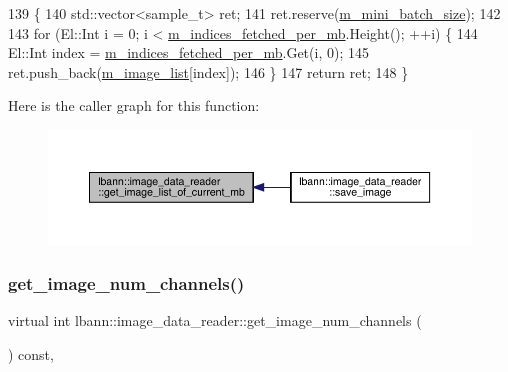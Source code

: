 \begin{DoxyCode}
139                                                                                            \{
140   std::vector<sample\_t> ret;
141   ret.reserve(\hyperlink{classlbann_1_1generic__data__reader_a96f87a7d09711ab3eee3940ff2aa36ec}{m\_mini\_batch\_size});
142 
143   \textcolor{keywordflow}{for} (El::Int i = 0; i < \hyperlink{classlbann_1_1generic__data__reader_a4ee1a159c74561c15a5e0c267ad3cc6a}{m\_indices\_fetched\_per\_mb}.Height(); ++i) \{
144     El::Int index = \hyperlink{classlbann_1_1generic__data__reader_a4ee1a159c74561c15a5e0c267ad3cc6a}{m\_indices\_fetched\_per\_mb}.Get(i, 0);
145     ret.push\_back(\hyperlink{classlbann_1_1image__data__reader_ae3fc949bd08c45ceafb1a03503261008}{m\_image\_list}[index]);
146   \}
147   \textcolor{keywordflow}{return} ret;
148 \}
\end{DoxyCode}
Here is the caller graph for this function\+:\nopagebreak
\begin{figure}[H]
\begin{center}
\leavevmode
\includegraphics[width=350pt]{classlbann_1_1image__data__reader_a9624d37e076cf71154b65910dd7e1195_icgraph}
\end{center}
\end{figure}
\mbox{\label{classlbann_1_1image__data__reader_a3699aa92d3ef2ccc0c30ecf27809acbe}} 
\subsubsection{\texorpdfstring{get\+\_\+image\+\_\+num\+\_\+channels()}{get\_image\_num\_channels()}}
{\footnotesize\ttfamily virtual int lbann\+::image\+\_\+data\+\_\+reader\+::get\+\_\+image\+\_\+num\+\_\+channels (\begin{DoxyParamCaption}{ }\end{DoxyParamCaption}) const\hspace{0.3cm}{\ttfamily [inline]}, {\ttfamily [virtual]}}



